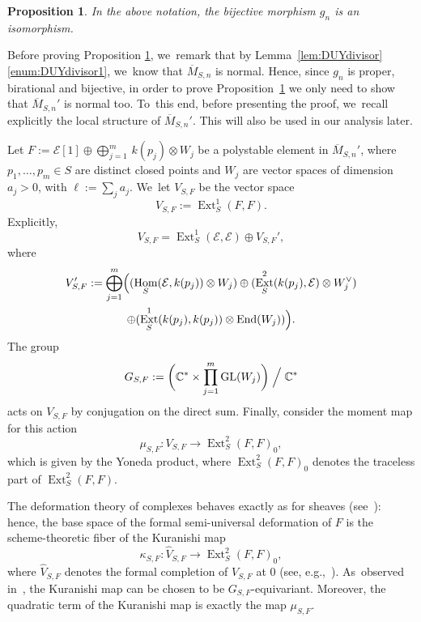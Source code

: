 \documentclass[JEP,XML,SOM,Unicode,published]{cedram}
\newcommand{\CC}{{\mathbb C}}\let\C\CC
\newcommand\cE{\mathcal{E}}
\DeclareMathOperator{\End}{End}
\DeclareMathOperator{\Ext}{Ext}
\DeclareMathOperator{\GL}{GL}
\DeclareMathOperator{\Hom}{Hom}
\newtheorem{prop}[lemm]{Proposition}
\theoremstyle{definition}
\begin{document}
\begin{prop}\label{prop:UhlenbeckVsBridgeland}
In the above notation, the bijective morphism $g_n$ is an isomorphism.
\end{prop}

Before proving Proposition \ref{prop:UhlenbeckVsBridgeland}, we~remark that by Lemma~\ref{lem:DUYdivisor}\ref{enum:DUYdivisor1}, we~know that $\overline{M}_{S,n}$ is normal.
Hence, since $g_n$ is proper, birational and bijective, in order to prove Proposition~\ref{prop:UhlenbeckVsBridgeland} we only need to show that $\overline{M}{}_{S,n}'$ is normal too. To~this end, before presenting the proof, we~recall explicitly the local structure of $\overline{M}{}_{S,n}'$. This will also be used in our analysis later.

Let $F:=\cE[1]\oplus \bigoplus_{j=1}^m\, k(p_j)\otimes W_j$ be a polystable element in $\overline{M}{}_{S,n}'$, where $p_1,\dots,p_m\in S$ are distinct closed points and $W_j$ are vector spaces of dimension $a_j>0$, with $\ell:=\sum_j a_j$. We~let $V_{S,F}$ be the vector space
\[
V_{S,F}:=\Ext^1_S(F,F).
\]
Explicitly,
\begin{equation*}\label{eq:SplittingK3Antony}
V_{S,F}=\Ext^1_S(\cE,\cE)\oplus V_{S,F}',
\end{equation*}
where
\begin{multline}\label{eqroma24}
V_{S,F}':=\bigoplus_{j=1}^m\Bigl((\Hom_S(\cE,k(p_j))\otimes W_j) \oplus (\Ext^2_S(k(p_j),\cE)\otimes W_j^\vee)\\
\oplus (\Ext^1_S(k(p_j),k(p_j))\otimes \End(W_j)) \Bigr).
\end{multline}
The group
\begin{equation}\label{eq:group}
G_{S,F}:=\biggl(\CC^*\times \prod_{j=1}^m\GL(W_j)\biggr)\Bigm/\CC^*
\end{equation}
acts on $V_{S,F}$ by conjugation on the direct sum.
Finally, consider the moment map for this action
\[
\mu_{S,F}\colon V_{S,F} \to \Ext^2_S(F,F)_0,
\]
which is given by the Yoneda product, where $\Ext^2_S(F,F)_0$ denotes the traceless part of $\Ext^2_S(F,F)$.

The deformation theory of complexes behaves exactly as for sheaves (see~\cite[Th.\,3.1.1]{Lieblich:moduli}): hence, the base space of the formal semi-universal deformation of $F$ is the scheme-theoretic fiber of the Kuranishi map
\[
\kappa_{S,F} \colon \widehat{V}_{S,F} \to \Ext^2_S(F,F)_0,
\]
where $\widehat{V}_{S,F}$ denotes the formal completion of $V_{S,F}$ at $0$ (see, e.g.,~\cite[\S 3]{AS:singularities}). As~observed in~\cite[\S 4]{AS:singularities}, the Kuranishi map can be chosen to be $G_{S,F}$-equivariant.
Moreover, the quadratic term of the Kuranishi map is exactly the map $\mu_{S,F}$.
\end{document}
